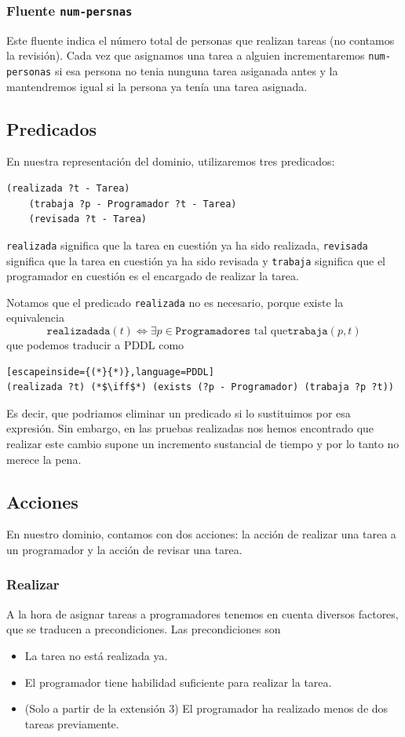 \documentclass[12pt, titlepage]{article}
\begin{document}
\subsubsection{Fluente \texttt{num-persnas}}
Este fluente indica el número total de personas que realizan tareas (no contamos
la revisión). Cada vez que asignamos una tarea a alguien incrementaremos
\texttt{num-personas} si esa persona no tenia nunguna tarea asiganada antes y la
mantendremos igual si la persona ya tenía una tarea asignada.

\subsection{Predicados}
En nuestra representación del dominio, utilizaremos tres predicados:
\begin{lstlisting}[language=PDDL]
    (realizada ?t - Tarea)
    (trabaja ?p - Programador ?t - Tarea)
    (revisada ?t - Tarea)
\end{lstlisting}

\texttt{realizada} significa que la tarea en cuestión ya ha sido realizada,
\texttt{revisada} significa que la tarea en cuestión ya ha sido revisada y
\texttt{trabaja} significa que el programador en cuestión es el encargado de
realizar la tarea.

Notamos que el predicado \texttt{realizada} no es necesario, porque existe la
equivalencia
\[
    \texttt{realizadada}(t) \iff \exists p \in \texttt{Programadores} \text{ tal
    que} \texttt{trabaja}(p, t)
\]
que podemos traducir a PDDL como
\begin{lstlisting}[escapeinside={(*}{*)},language=PDDL]
(realizada ?t) (*$\iff$*) (exists (?p - Programador) (trabaja ?p ?t))
\end{lstlisting}

Es decir, que podriamos eliminar un predicado si lo sustituimos por esa
expresión. Sin embargo, en las pruebas realizadas nos hemos encontrado que
realizar este cambio supone un incremento sustancial de tiempo y por lo tanto no merece la pena.

\subsection{Acciones}
En nuestro dominio, contamos con dos acciones: la acción de realizar una tarea a
un programador y la acción de revisar una tarea.

\subsubsection{Realizar}
A la hora de asignar tareas a programadores tenemos en cuenta diversos factores,
que se traducen a precondiciones. Las precondiciones son
\begin{itemize}
    \item La tarea no está realizada ya.
    \item El programador tiene habilidad suficiente para realizar la tarea.
    \item (Solo a partir de la extensión 3) El programador ha realizado menos de
        dos tareas previamente.
\end{itemize}
\end{document}
